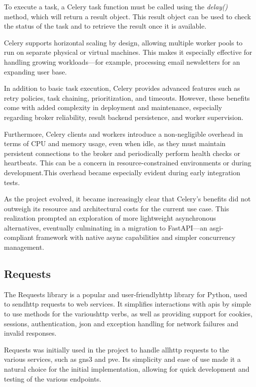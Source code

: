 To execute a task, a Celery task function must be called using the \textit{delay()} method, which will return a result object. 
This result object can be used to check the status of the task and to retrieve the result once it is available.

Celery supports horizontal scaling by design, allowing multiple worker pools to run on separate physical or virtual machines. 
This makes it especially effective for handling growing workloads—for example, processing email newsletters for an expanding 
user base.

In addition to basic task execution, Celery provides advanced features such as retry policies, task chaining, prioritization, 
and timeouts. However, these benefits come with added complexity in deployment and maintenance, especially regarding broker 
reliability, result backend persistence, and worker supervision.

Furthermore, Celery clients and workers introduce a non-negligible overhead in terms of CPU and memory usage, even when 
idle, as they must maintain persistent connections to the broker and periodically perform health checks or heartbeats. 
This can be a concern in resource-constrained environments or during development.This overhead became especially evident 
during early integration tests.

As the project evolved, it became increasingly clear that Celery's benefits did not outweigh its resource and 
architectural costs for the current use case. This realization prompted an exploration of more lightweight asynchronous 
alternatives, eventually culminating in a migration to FastAPI—an \ac{asgi}-compliant framework with native async capabilities 
and simpler concurrency management.


\subsection{Requests}
The Requests\cite{requests2025} library is a popular and user-friendly\ac{http} library for Python, used to send\ac{http} 
requests to web services. It simplifies interactions with \ac{api}s by simple to use methods for the various\ac{http} verbs, 
as well as providing support for cookies, sessions, authentication, \ac{json} and exception handling for network failures and 
invalid responses.

Requests was initially used in the project to handle all\ac{http} requests to the various services, such as
\ac{gns3} and \ac{pve}. Its simplicity and ease of use made it a natural choice for the initial implementation, allowing
for quick development and testing of the various endpoints.

